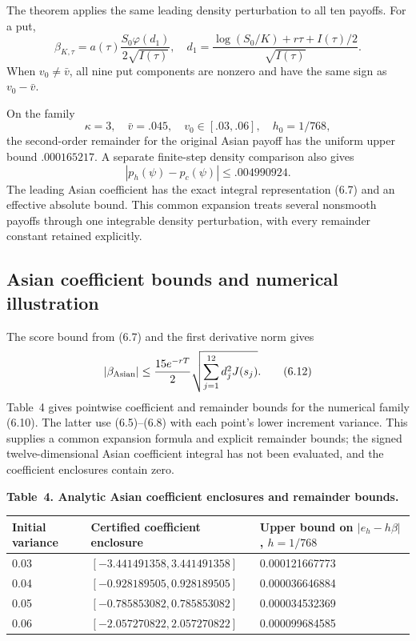 \documentclass[11pt,a4paper]{article}
\begin{document}
The theorem applies the same leading density perturbation to all ten payoffs.
For a put,
\[
\beta_{K,\tau}
=a(\tau)\frac{S_0\varphi(d_1)}{2\sqrt{I(\tau)}},
\quad
d_1=\frac{\log(S_0/K)+r\tau+I(\tau)/2}{\sqrt{I(\tau)}}.
\tag{6.9}
\]
When \(v_0\ne\bar v\), all nine put components are nonzero and have the same sign as
\(v_0-\bar v\).

On the family
\[
\kappa=3,\quad\bar v=.045,\quad v_0\in[.03,.06],\quad h_0=1/768,
\tag{6.10}
\]
the second-order remainder for the original Asian payoff has the uniform upper bound
\(.000165217\). A separate finite-step density comparison also gives
\[
|p_h(\psi)-p_c(\psi)|\le .004990924.
\tag{6.11}
\]
The leading Asian coefficient has the exact integral representation (6.7) and an effective absolute bound.
This common expansion treats several nonsmooth payoffs through one integrable density perturbation,
with every remainder constant retained explicitly.

\subsection{Asian coefficient bounds and numerical illustration}

The score bound from (6.7) and the first derivative norm gives
\[
|\beta_{\rm Asian}|
\le {15e^{-rT}\over2}\sqrt{\sum_{j=1}^{12}d_j^2J(s_j)}.
\tag{6.12}
\]
Table~4 gives pointwise coefficient and remainder bounds for the numerical
family (6.10). The latter use (6.5)--(6.8) with each point's lower increment
variance. This supplies a common expansion formula and explicit remainder
bounds; the signed twelve-dimensional Asian coefficient integral has not been
evaluated, and the coefficient enclosures contain zero.

\noindent\textbf{Table~4. Analytic Asian coefficient enclosures and remainder bounds.}
\begin{center}
\begin{tabularx}{\textwidth}{@{}l X X@{}}
\toprule
Initial variance & Certified coefficient enclosure & Upper bound on \(|e_h-h\beta|\), \(h=1/768\) \\
\midrule
0.03 & \([-3.441491358,3.441491358]\) & 0.000121667773 \\
0.04 & \([-0.928189505,0.928189505]\) & 0.000036646884 \\
0.05 & \([-0.785853082,0.785853082]\) & 0.000034532369 \\
0.06 & \([-2.057270822,2.057270822]\) & 0.000099684585 \\
\bottomrule
\end{tabularx}
\end{center}
\end{document}
